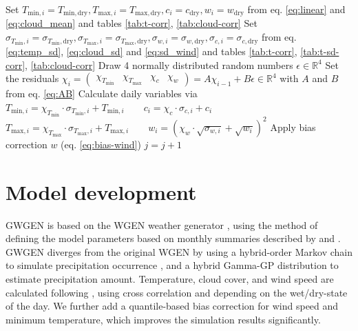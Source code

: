 \documentclass[
11pt, %
english, %
singlespacing, %
headsepline, %
]{MastersDoctoralThesis} %
\begin{document}
\begin{NoHyper}
\begin{refsection}
\begin{algorithm}
\begin{algorithmic}[1]
		\STATE Set $T_{\mathrm{min}, i} = T_{\mathrm{min}, \mathrm{dry}}, T_{\mathrm{max}, i} = T_{\mathrm{max}, \mathrm{dry}}, c_i = c_\mathrm{dry}, w_i = w_\mathrm{dry}$ from eq. \eqref{eq:linear} and \eqref{eq:cloud_mean} and tables \ref{tab:t-corr}, \ref{tab:cloud-corr}
		\label{a:gwgen:adjust_dry}
		\STATE Set $
		\sigma_{T_\mathrm{min},i} = \sigma_{T_\mathrm{min},\mathrm{dry}}, \sigma_{T_\mathrm{max},i} = \sigma_{T_\mathrm{max},\mathrm{dry}}, \sigma_{w,i} = \sigma_{w,\mathrm{dry}}, \sigma_{c,i} = \sigma_{c,\mathrm{dry}}$ from eq. \eqref{eq:temp_sd}, \eqref{eq:cloud_sd} and \eqref{eq:sd_wind} and tables \ref{tab:t-corr}, \ref{tab:t-sd-corr}, \ref{tab:cloud-corr}
		\ENDIF
		\STATE Draw 4 normally distributed random numbers $\epsilon\in\mathbb{R}^4$  \label{a:gwgen:cross}
		\STATE Set the residuals 
		$\chi_i = 
		\begin{pmatrix} 
		\chi_{T_\mathrm{min}} & \chi_{T_\mathrm{max}} & \chi_c & \chi_w
		\end{pmatrix} = A\chi_{i-1} + B\epsilon \in \mathbb{R}^4$ with $A$ and $B$ from eq. \eqref{eq:AB}
		\STATE Calculate daily variables via \\
		$T_{\mathrm{min},i} = \chi_{T_\mathrm{min}} \cdot \sigma_{T_\mathrm{min},i} + T_{\mathrm{min}, i} \qquad c_{i} = \chi_{c} \cdot \sigma_{c,i} + c_{i}$ \\
		$T_{\mathrm{max},i} = \chi_{T_\mathrm{max}} \cdot \sigma_{T_\mathrm{max},i} + T_{\mathrm{max}, i} \qquad w_{i} = \left(\chi_{w} \cdot \sqrt{\sigma_{w,i}} + \sqrt{w_{i}}\right)^2$ \label{a:gwgen:cross-end}
		\STATE Apply bias correction $w$ (eq. \eqref{eq:bias-wind}) 
		\STATE $j = j + 1$
		\ENDFOR
		\ENDWHILE
		\ENDFOR
	\end{algorithmic}
\end{algorithm}


\section{Model development}

GWGEN is based on the WGEN weather generator \citep{Richardson1981}, using the method of defining the model parameters based on monthly summaries described by \cite{GengDevriesSupit1986} and \cite{GengAuburn1987}. GWGEN diverges from the original WGEN by using a hybrid-order Markov chain to simulate precipitation occurrence \citep{Wilks1999}, and a hybrid Gamma-GP distribution \citep{FurrerKatz2008,NeykovNeytchevZucchini2014} to estimate precipitation amount. Temperature, cloud cover, and wind speed are calculated following \citep{Richardson1981}, using cross correlation and depending on the wet/dry-state of the day. We further add a quantile-based bias correction for wind speed and minimum temperature, which improves the simulation results significantly.


\end{refsection}
\end{NoHyper}
\end{document}

